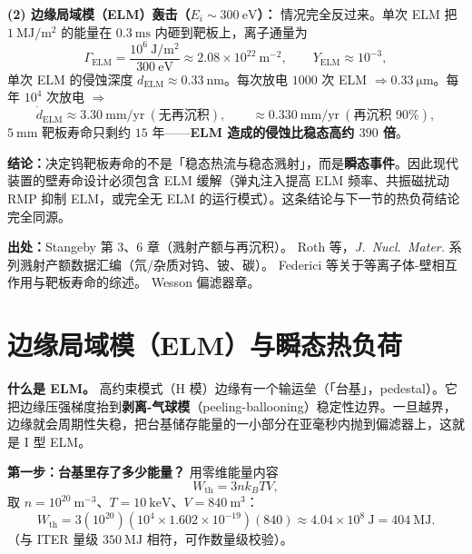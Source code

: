 \textbf{(2) 边缘局域模（ELM）轰击（$E_i\sim300\ \mathrm{eV}$）：} 情况完全反过来。单次 ELM 把 $1\ \mathrm{MJ/m^2}$ 的能量在 $0.3\ \mathrm{ms}$ 内砸到靶板上，离子通量为
\begin{equation}
\Gamma_{\mathrm{ELM}}=\frac{10^{6}\ \mathrm{J/m^2}}{300\ \mathrm{eV}}\approx2.08\times10^{22}\ \mathrm{m^{-2}},
\qquad
Y_{\mathrm{ELM}}\approx10^{-3},
\end{equation}
单次 ELM 的侵蚀深度 $d_{\mathrm{ELM}}\approx0.33\ \mathrm{nm}$。每次放电 $1000$ 次 ELM $\Rightarrow0.33\ \mathrm{\mu m}$。每年 $10^{4}$ 次放电 $\Rightarrow$
\begin{equation}
\dot{d}_{\mathrm{ELM}}\approx3.30\ \mathrm{mm/yr}\ (\text{无再沉积}),
\qquad
\approx0.330\ \mathrm{mm/yr}\ (\text{再沉积 $90\%$}),
\end{equation}
$5\ \mathrm{mm}$ 靶板寿命只剩约 $15$ 年——\textbf{ELM 造成的侵蚀比稳态高约 $390$ 倍}。

\textbf{结论：}决定钨靶板寿命的不是「稳态热流与稳态溅射」，而是\textbf{瞬态事件}。因此现代装置的壁寿命设计必须包含 ELM 缓解（弹丸注入提高 ELM 频率、共振磁扰动 RMP 抑制 ELM，或完全无 ELM 的运行模式）。这条结论与下一节的热负荷结论完全同源。

{\footnotesize
\textbf{出处：}Stangeby 第 3、6 章（溅射产额与再沉积）。
Roth 等，\textit{J.\ Nucl.\ Mater.} 系列溅射产额数据汇编（氘/杂质对钨、铍、碳）。
Federici 等关于等离子体-壁相互作用与靶板寿命的综述。
Wesson 偏滤器章。
}


\section{边缘局域模（ELM）与瞬态热负荷}

\textbf{什么是 ELM。} 高约束模式（H 模）边缘有一个输运垒（「台基」，pedestal）。它把边缘压强梯度抬到\textbf{剥离-气球模}（peeling-ballooning）稳定性边界。一旦越界，边缘就会周期性失稳，把台基储存能量的一小部分在亚毫秒内抛到偏滤器上，这就是 I 型 ELM。

\textbf{第一步：台基里存了多少能量？} 用零维能量内容
\begin{equation}
W_{\mathrm{th}}=3n k_BT V,
\end{equation}
取 $n=10^{20}\ \mathrm{m^{-3}}$、$T=10\ \mathrm{keV}$、$V=840\ \mathrm{m^3}$：
\begin{equation}
W_{\mathrm{th}}=3(10^{20})(10^{4}\times1.602\times10^{-19})(840)\approx4.04\times10^{8}\ \mathrm{J}=404\ \mathrm{MJ}.
\end{equation}
（与 ITER 量级 $350\ \mathrm{MJ}$ 相符，可作数量级校验）。

